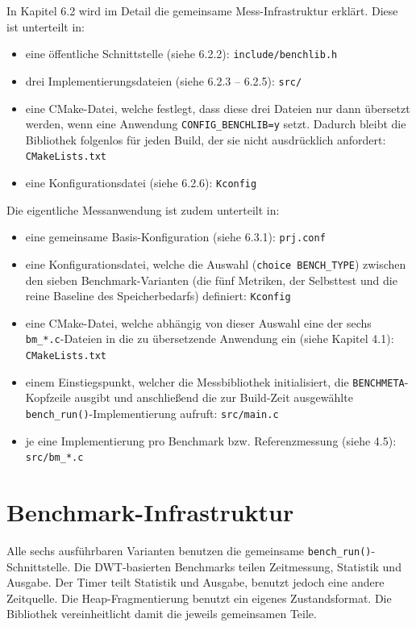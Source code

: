 In Kapitel 6.2 wird im Detail die gemeinsame Mess-Infrastruktur erklärt. Diese ist unterteilt in:

\begin{itemize}
\item eine öffentliche Schnittstelle (siehe 6.2.2): \lstinline[style=fileinline]|include/benchlib.h|
\item drei Implementierungsdateien (siehe 6.2.3 – 6.2.5): \lstinline[style=fileinline]|src/|
\item eine CMake-Datei, welche festlegt, dass diese drei Dateien nur dann übersetzt werden, wenn eine Anwendung \lstinline[style=fileinline]|CONFIG_BENCHLIB=y| setzt. Dadurch bleibt die Bibliothek folgenlos für jeden Build, der sie nicht ausdrücklich anfordert: \lstinline[style=fileinline]|CMakeLists.txt|
\item eine Konfigurationsdatei (siehe 6.2.6): \lstinline[style=fileinline]|Kconfig|
\end{itemize}
Die eigentliche Messanwendung ist zudem unterteilt in:

\begin{itemize}
\item eine gemeinsame Basis-Konfiguration (siehe 6.3.1): \lstinline[style=fileinline]|prj.conf|
\item eine Konfigurationsdatei, welche die Auswahl (\lstinline[style=fileinline]|choice BENCH_TYPE|) zwischen den sieben Benchmark-Varianten (die fünf Metriken, der Selbsttest und die reine Baseline des Speicherbedarfs) definiert: \lstinline[style=fileinline]|Kconfig|
\item eine CMake-Datei, welche abhängig von dieser Auswahl eine der sechs \lstinline[style=fileinline]|bm_*.c|-Dateien in die zu übersetzende Anwendung ein (siehe Kapitel 4.1): \lstinline[style=fileinline]|CMakeLists.txt|
\item einem Einstiegspunkt, welcher die Messbibliothek initialisiert, die \lstinline[style=fileinline]|BENCHMETA|-Kopfzeile ausgibt und anschließend die zur Build-Zeit ausgewählte \lstinline[style=fileinline]|bench_run()|-Implementierung aufruft: \lstinline[style=fileinline]|src/main.c|
\item je eine Implementierung pro Benchmark bzw. Referenzmessung (siehe 4.5): \lstinline[style=fileinline]|src/bm_*.c|
\end{itemize}
\section{Benchmark-Infrastruktur}
Alle sechs ausführbaren Varianten benutzen die gemeinsame \lstinline[style=fileinline]|bench_run()|-Schnittstelle. Die DWT-basierten Benchmarks teilen Zeitmessung, Statistik und Ausgabe. Der Timer teilt Statistik und Ausgabe, benutzt jedoch eine andere Zeitquelle. Die Heap-Fragmentierung benutzt ein eigenes Zustandsformat. Die Bibliothek vereinheitlicht damit die jeweils gemeinsamen Teile.

